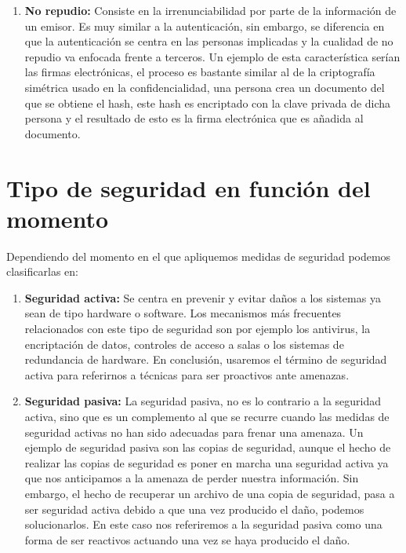 \begin{enumerate}
\item {\bfseries No repudio:}
Consiste en la irrenunciabilidad por parte de la información de un emisor. Es muy similar a la autenticación, sin embargo, se diferencia en que la autenticación se centra en las personas implicadas y la cualidad de no repudio va enfocada frente a terceros. Un ejemplo de esta característica serían las firmas electrónicas, el proceso es bastante similar al de la criptografía simétrica usado en la confidencialidad, una persona crea un documento del que se obtiene el hash, este hash es encriptado con la clave privada de dicha persona y el resultado de esto es la firma electrónica que es añadida al documento.\cite{caracteristicasseguridad}
\end{enumerate}
\section{Tipo de seguridad en función del momento} 
Dependiendo del momento en el que apliquemos medidas de seguridad podemos clasificarlas en: 
\begin{enumerate}
\item {\bfseries Seguridad activa:}
Se centra en prevenir y evitar daños a los sistemas ya sean de tipo hardware o software. Los mecanismos más frecuentes relacionados con este tipo de seguridad son por ejemplo los antivirus, la encriptación de datos, controles de acceso a salas o los sistemas de redundancia de hardware. En conclusión, usaremos el término de seguridad activa para referirnos a técnicas para ser proactivos ante amenazas. 
\item {\bfseries Seguridad pasiva:}
La seguridad pasiva, no es lo contrario a la seguridad activa, sino que es un complemento al que se recurre cuando las medidas de seguridad activas no han sido adecuadas para frenar una amenaza. Un ejemplo de seguridad pasiva son las copias de seguridad, aunque el hecho de realizar las copias de seguridad es poner en marcha una seguridad activa ya que nos anticipamos a la amenaza de perder nuestra información. Sin embargo, el hecho de recuperar un archivo de una copia de seguridad, pasa a ser seguridad activa debido a que una vez producido el daño, podemos solucionarlos. En este caso nos referiremos a la seguridad pasiva como una forma de ser reactivos actuando una vez se haya producido el daño.\cite{activaypasiva}
 \end{enumerate}




